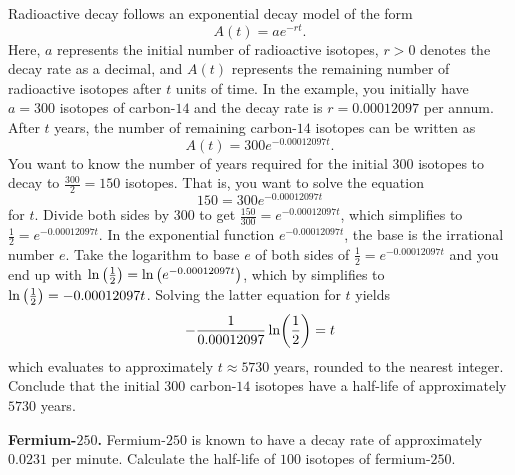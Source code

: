\documentclass[a4paper,oneside,12pt]{article}
\begin{document}
\begin{solution}
Radioactive decay follows an exponential decay model of the form
\[
A(t)
=
a e^{-rt}.
\]
Here, $a$ represents the initial number of radioactive isotopes,
$r > 0$ denotes the decay rate as a decimal, and $A(t)$ represents the
remaining number of radioactive isotopes after $t$ units of time.  In
the example, you initially have $a = 300$ isotopes of carbon-$14$ and
the decay rate is $r = 0.00012097$ per annum.  After $t$ years, the
number of remaining carbon-$14$ isotopes can be written as
\[
A(t)
=
300 e^{-0.00012097 t}.
\]
You want to know the number of years required for the initial $300$
isotopes to decay to $\frac{300}{2} = 150$ isotopes.  That is, you
want to solve the equation
\[
150
=
300 e^{-0.00012097 t}
\]
for $t$.  Divide both sides by $300$ to get
$\frac{150}{300} = e^{-0.00012097 t}$, which simplifies to
$\frac{1}{2} = e^{-0.00012097 t}$.  In the exponential function
$e^{-0.00012097 t}$, the base is the irrational number $e$.  Take the
logarithm to base $e$ of both sides of
$\frac{1}{2} = e^{-0.00012097 t}$ and you end up with
$\ln \big(\frac{1}{2}\big) = \ln \big(e^{-0.00012097 t}\big)$,
which by  simplifies to
$\ln \big(\frac{1}{2}\big) = -0.00012097 t$.  Solving the latter
equation for $t$ yields
\[
-\frac{1}{0.00012097}
\ln \parenthesis*{\frac{1}{2}}
=
t
\]
which evaluates to approximately $t \approx 5730$ years, rounded to
the nearest integer.  Conclude that the initial $300$ carbon-$14$
isotopes have a half-life of approximately $5730$ years.
\end{solution}

\begin{exercise}
\textbf{Fermium-$250$.}
Fermium-$250$ is known to have a decay rate of approximately $0.0231$
per minute.  Calculate the half-life of $100$ isotopes of
fermium-$250$.
\end{exercise}

\end{document}
